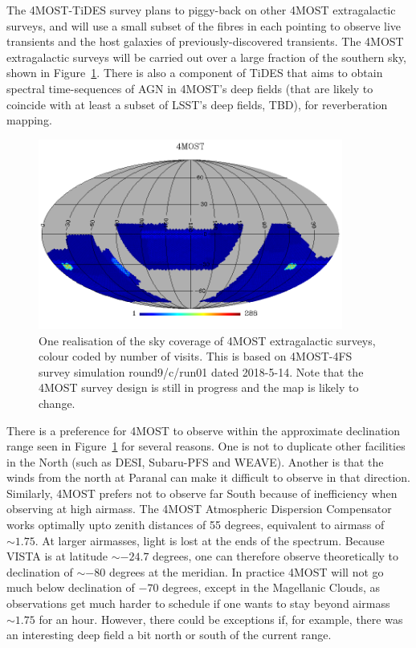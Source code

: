 \documentclass[a4paper,10pt]{article}
\begin{document}
The 4MOST-TiDES survey plans to piggy-back on other 4MOST
extragalactic surveys, and will use a small subset of the fibres in
each pointing to observe live transients and the host galaxies of
previously-discovered transients. The 4MOST extragalactic surveys will
be carried out over a large fraction of the southern sky, shown in
Figure~\ref{fig:4most_sky}.  There is also a component of TiDES that aims
to obtain spectral time-sequences of AGN in 4MOST's deep fields (that
are likely to coincide with at least a subset of LSST's deep fields,
TBD), for reverberation mapping.

\begin{figure}[!htbp]
\begin{center}
  \includegraphics[width=10.0cm]{4most_fndep.png}
\end{center}
\caption{One realisation of the sky coverage of 4MOST extragalactic
  surveys, colour coded by number of visits. This is based on
  4MOST-4FS survey simulation round9/c/run01 dated 2018-5-14. Note
  that the 4MOST survey design is still in progress and the map is
  likely to change.}
\label{fig:4most_sky}
\end{figure}

There is a preference for 4MOST to observe within the approximate
declination range seen in Figure~\ref{fig:4most_sky} for several
reasons. One is not to duplicate other facilities in the North (such
as DESI, Subaru-PFS and WEAVE). Another is that the winds from the
north at Paranal can make it difficult to observe in that
direction. Similarly, 4MOST prefers not to observe far South because
of inefficiency when observing at high airmass. The 4MOST Atmospheric
Dispersion Compensator works optimally upto zenith distances of 55
degrees, equivalent to airmass of $\sim1.75$. At larger airmasses,
light is lost at the ends of the spectrum. Because VISTA is at
latitude $\sim -24.7$ degrees, one can therefore observe theoretically
to declination of $\sim -80$ degrees at the meridian. In practice
4MOST will not go much below declination of $-70$ degrees, except in
the Magellanic Clouds, as observations get much harder to schedule if
one wants to stay beyond airmass $\sim 1.75$ for an hour. However,
there could be exceptions if, for example, there was an interesting
deep field a bit north or south of the current range.
\end{document}
